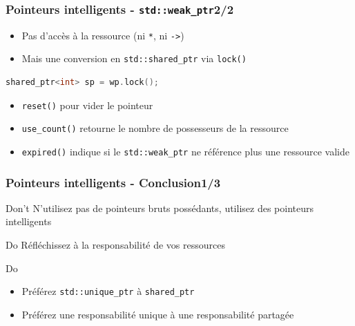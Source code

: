 \documentclass[C++.tex]{subfiles}
\begin{document}
\begin{frame}[fragile]
	\frametitle{Pointeurs intelligents - \lstinline|std::weak_ptr|\titlehfill{}2/2}
	\begin{itemize}
		\item Pas d'accès à la ressource (ni \lstinline|*|, ni \lstinline|->|)
		\item Mais une conversion en \lstinline|std::shared_ptr| via \lstinline|lock()|

	\end{itemize}

	\begin{lstlisting}[language=C++]
shared_ptr<int> sp = wp.lock();\end{lstlisting}

	\begin{itemize}
		\item \lstinline|reset()| pour vider le pointeur
		\item \lstinline|use_count()| retourne le nombre de possesseurs de la ressource


		\item \lstinline|expired()| indique si le \lstinline|std::weak_ptr| ne référence plus une ressource valide

	\end{itemize}
\end{frame}

\begin{frame}[fragile]
	\frametitle{Pointeurs intelligents - Conclusion\titlehfill{}1/3}
	\begin{alertblock}{Don't}
		N'utilisez pas de pointeurs bruts possédants, utilisez des pointeurs intelligents
	\end{alertblock}

	\begin{exampleblock}{Do}
		Réfléchissez à la responsabilité de vos ressources
	\end{exampleblock}

	\begin{exampleblock}{Do}
		\begin{itemize}
			\item Préférez \lstinline|std::unique_ptr| à \lstinline|shared_ptr|
			\item Préférez une responsabilité unique à une responsabilité partagée

		\end{itemize}
	\end{exampleblock}
\end{frame}
\end{document}
